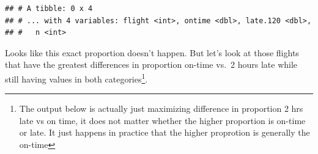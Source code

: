\documentclass[]{book}
\newenvironment{Shaded}{\begin{snugshade}}{\end{snugshade}}
\newcommand{\CommentTok}[1]{\textcolor[rgb]{0.56,0.35,0.01}{\textit{#1}}}
\newcommand{\DataTypeTok}[1]{\textcolor[rgb]{0.13,0.29,0.53}{#1}}
\newcommand{\DecValTok}[1]{\textcolor[rgb]{0.00,0.00,0.81}{#1}}
\newcommand{\FloatTok}[1]{\textcolor[rgb]{0.00,0.00,0.81}{#1}}
\newcommand{\KeywordTok}[1]{\textcolor[rgb]{0.13,0.29,0.53}{\textbf{#1}}}
\newcommand{\NormalTok}[1]{#1}
\newcommand{\OperatorTok}[1]{\textcolor[rgb]{0.81,0.36,0.00}{\textbf{#1}}}
\newcommand{\OtherTok}[1]{\textcolor[rgb]{0.56,0.35,0.01}{#1}}
\newcommand{\StringTok}[1]{\textcolor[rgb]{0.31,0.60,0.02}{#1}}
\let\rmarkdownfootnote\footnote%
\def\footnote{\protect\rmarkdownfootnote}
\theoremstyle{definition}
\theoremstyle{definition}
\theoremstyle{definition}
\theoremstyle{remark}
\begin{document}
\begin{Shaded}
\end{Shaded}

\begin{verbatim}
## # A tibble: 0 x 4
## # ... with 4 variables: flight <int>, ontime <dbl>, late.120 <dbl>,
## #   n <int>
\end{verbatim}

Looks like this exact proportion doesn't happen. But let's look at those
flights that have the greatest differences in proportion on-time vs.~2
hours late while still having values in both categories\footnote{The
  output below is actually just maximizing difference in proportion 2
  hrs late vs on time, it does not matter whether the higher proportion
  is on-time or late. It just happens in practice that the higher
  proprotion is generally the on-time}.
\end{document}
